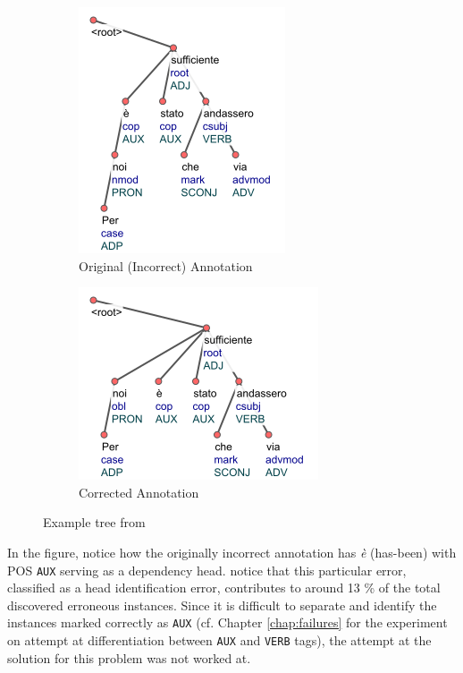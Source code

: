 \begin{figure}[H]
    \centering
    \begin{subfigure}{.45\textwidth}
  \centering
  \includegraphics[scale=0.90]{img/before-aux.png}
  \caption{Original (Incorrect) Annotation}
  \label{fig:aux-head-skewed}
  \end{subfigure}
  \begin{subfigure}{.45\textwidth}
  \centering
  \includegraphics[scale=0.90]{img/after-aux.png}
  \caption{Corrected Annotation}
  \label{fig:aux-head-corrected}
  \end{subfigure}
    \caption{Example tree from \cite{alzetta2017dangerous}}
    \label{fig:aux-head-example}
\end{figure}
    
In the figure, notice how the originally incorrect annotation has \textit{\`e} (has-been) with POS \verb|AUX| serving as a dependency head. \citeauthor{alzetta2017dangerous} notice that this particular error, classified as a head identification error, contributes to around 13 \% of the total discovered erroneous instances. Since it is difficult to separate and identify the instances marked correctly as \verb|AUX| (cf. Chapter \ref{chap:failures} for the experiment on attempt at differentiation between \verb|AUX| and \verb|VERB|  tags), the attempt at the solution for this problem was not worked at.

